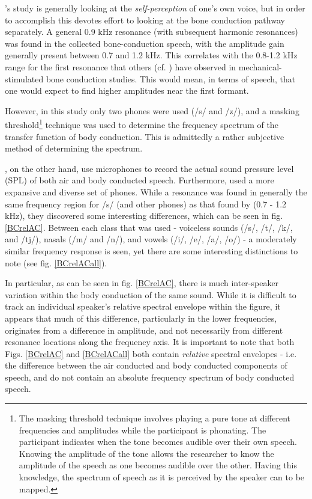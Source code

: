 \documentclass[dissertation,copyright]{uathesis}
\begin{document}
\cite{porschmann:00}'s study is generally looking at the \textit{self-perception} of one's own voice, but in order to accomplish this devotes effort to looking at the bone conduction pathway separately.  A general 0.9 kHz resonance (with subsequent harmonic resonances) was found in the collected bone-conduction speech, with the amplitude gain generally present between 0.7 and 1.2 kHz.  This correlates with the 0.8-1.2 kHz range for the first resonance that others  (cf. \cite{hakansson:94}) have observed in mechanical-stimulated bone conduction studies. This would mean, in terms of speech, that one would expect to find higher amplitudes near the first formant.

However, in this study only two phones were used (/s/ and /z/), and a masking threshold\footnote{The masking threshold technique involves playing a pure tone at different frequencies and amplitudes while the participant is phonating. The participant indicates when the tone becomes audible over their own speech. Knowing the amplitude of the tone allows the researcher to know the amplitude of the speech as one becomes audible over the other. Having this knowledge, the spectrum of speech as it is perceived by the speaker can to be mapped.} technique was used to determine the frequency spectrum of the transfer function of body conduction.  This is admittedly a rather subjective method of determining the spectrum.  

\cite{reinfeldt:10}, on the other hand, use microphones to record the actual sound pressure level (SPL) of both air and body conducted speech. Furthermore, \cite{reinfeldt:10} used a more expansive and diverse set of phones.  While a resonance was found in generally the same frequency region for /s/ (and other phones) as that found by \cite{porschmann:00} (0.7 - 1.2 kHz), they discovered some interesting differences, which can be seen in fig. \ref{BCrelAC}. Between each class that was used - voiceless sounds (/s/, /t/, /k/, and /tj/),  nasals (/m/ and /n/), and vowels (/i/, /e/, /a/, /o/) - a moderately similar frequency response is seen, yet there are some interesting distinctions to note (see fig. \ref{BCrelACall}).

In particular, as can be seen in fig. \ref{BCrelAC}, there is much inter-speaker variation within the body conduction of the same sound.  While it is difficult to track an individual speaker's relative spectral envelope within the figure, it appears that much of this difference, particularly in the lower frequencies, originates from a difference in amplitude, and not necessarily from different resonance locations along the frequency axis.  It is important to note that both Figs. \ref{BCrelAC} and \ref{BCrelACall} both contain \textit{relative} spectral envelopes - i.e. the difference between the air conducted and body conducted components of speech, and do not contain an absolute frequency spectrum of body conducted speech. 
\end{document}
